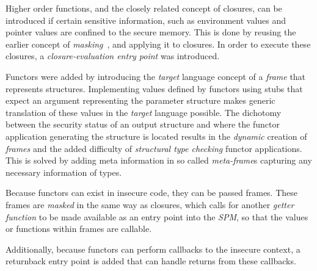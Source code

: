 Higher order functions, and the closely related concept of closures, can be introduced if certain sensitive information, such as environment values and pointer values are confined to the secure memory.
This is done by reusing the earlier concept of \emph{masking}~\cite{Patrignani}, and applying it to closures.
In order to execute these closures, a \emph{closure-evaluation entry point} was introduced.

Functors were added by introducing the \emph{target} language concept of a \emph{frame} that represents structures.
Implementing values defined by functors using stubs that expect an argument representing the parameter structure makes generic translation of these values in the \emph{target} language possible.
The dichotomy between the security status of an output structure and where the functor application generating the structure is located results in the \emph{dynamic} creation of \emph{frames} and the added difficulty of \emph{structural type checking} functor applications.
This is solved by adding meta information in so called \emph{meta-frame}s capturing any necessary information of types.

Because functors can exist in insecure code, they can be passed frames. These frames are \emph{masked} in the same way as closures, which calls for another \emph{getter function} to be made available as an entry point into the \emph{SPM}, so that the values or functions within frames are callable.

Additionally, because functors can perform callbacks to the insecure context, a returnback entry point is added that can handle returns from these callbacks.